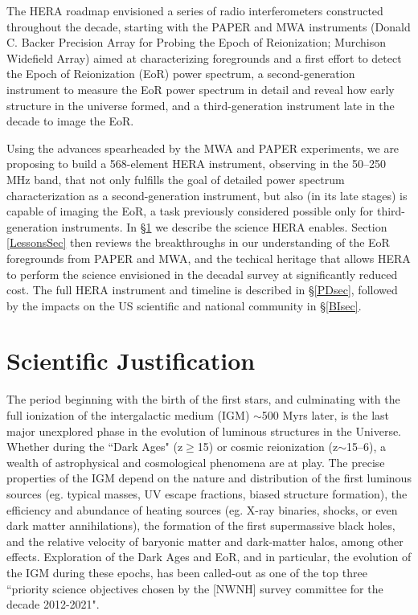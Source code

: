 \documentclass[preprint]{aastex}
\begin{document}
The HERA roadmap envisioned a series of radio interferometers constructed throughout the decade, starting with the PAPER and MWA instruments (Donald C. Backer Precision Array for Probing the Epoch of Reionization; Murchison Widefield Array) aimed at characterizing foregrounds and a first effort to detect the Epoch of Reionization (EoR) power spectrum, a second-generation instrument to measure the EoR power spectrum in detail and reveal how early structure in the universe formed, and a third-generation instrument late in the decade to image the EoR. 

Using the advances spearheaded by the MWA and PAPER experiments, we are proposing to build a 568-element HERA instrument, observing in the 50--250 MHz band, that not only fulfills the goal of detailed power spectrum characterization as a second-generation instrument, but also (in its late stages) is capable of imaging the EoR, a task previously considered possible only for third-generation instruments.
In \S \ref{SJsec} we describe the science HERA enables. Section \ref{LessonsSec} then reviews the breakthroughs in our understanding of the EoR foregrounds from PAPER and MWA, and the techical heritage that allows HERA to perform the science envisioned in the decadal survey at significantly reduced cost. The full HERA instrument and timeline is described in \S \ref{PDsec}, followed by the impacts on the US scientific and national community in \S \ref{BIsec}.

\vspace{-0.25in}
\section{Scientific Justification}
\label{SJsec}

The period beginning with the birth of the first stars, and culminating with
the full ionization of the intergalactic medium (IGM) $\sim$500 Myrs later, is
the last major unexplored phase in the evolution of luminous structures in the
Universe.  Whether during the ``Dark Ages" (z$\ge$15) or cosmic reionization
(z$\sim$15--6), a wealth of astrophysical and cosmological phenomena are at
play.  The precise properties of the IGM depend on the nature and distribution
of the first luminous sources (eg. typical masses, UV escape fractions, biased
structure formation), the efficiency and abundance of heating sources (eg.
X-ray binaries, shocks, or even dark matter annihilations), the formation of
the first supermassive black holes, and the relative velocity of baryonic
matter and dark-matter halos, among other effects.  Exploration of the Dark
Ages and EoR, and in particular, the evolution of
the IGM during these epochs, has been called-out as one of the top three
``priority science objectives chosen by the [NWNH] survey committee for the
decade 2012-2021".
\end{document}
